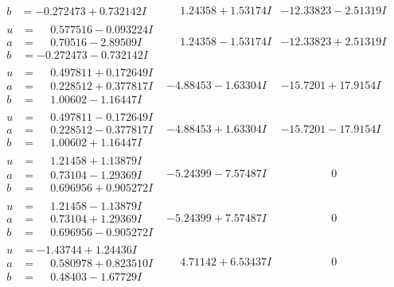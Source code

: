 \documentclass[1p]{elsarticle_modified}
\theoremstyle{definition}
\begin{document}
$$\begin{array}{c|c|c}
\begin{aligned}
b &= -0.272473 + 0.732142 I\end{aligned}
 & \phantom{-}1.24358 + 1.53174 I & -12.33823 - 2.51319 I \\ \hline\begin{aligned}
u &= \phantom{-}0.577516 - 0.093224 I \\
a &= \phantom{-}0.70516 - 2.89509 I \\
b &= -0.272473 - 0.732142 I\end{aligned}
 & \phantom{-}1.24358 - 1.53174 I & -12.33823 + 2.51319 I \\ \hline\begin{aligned}
u &= \phantom{-}0.497811 + 0.172649 I \\
a &= \phantom{-}0.228512 + 0.377817 I \\
b &= \phantom{-}1.00602 - 1.16447 I\end{aligned}
 & -4.88453 - 1.63304 I & -15.7201 + 17.9154 I \\ \hline\begin{aligned}
u &= \phantom{-}0.497811 - 0.172649 I \\
a &= \phantom{-}0.228512 - 0.377817 I \\
b &= \phantom{-}1.00602 + 1.16447 I\end{aligned}
 & -4.88453 + 1.63304 I & -15.7201 - 17.9154 I \\ \hline\begin{aligned}
u &= \phantom{-}1.21458 + 1.13879 I \\
a &= \phantom{-}0.73104 - 1.29369 I \\
b &= \phantom{-}0.696956 + 0.905272 I\end{aligned}
 & -5.24399 - 7.57487 I & \phantom{-0.000000 } 0 \\ \hline\begin{aligned}
u &= \phantom{-}1.21458 - 1.13879 I \\
a &= \phantom{-}0.73104 + 1.29369 I \\
b &= \phantom{-}0.696956 - 0.905272 I\end{aligned}
 & -5.24399 + 7.57487 I & \phantom{-0.000000 } 0 \\ \hline\begin{aligned}
u &= -1.43744 + 1.24436 I \\
a &= \phantom{-}0.580978 + 0.823510 I \\
b &= \phantom{-}0.48403 - 1.67729 I\end{aligned}
 & \phantom{-}4.71142 + 6.53437 I & \phantom{-0.000000 } 0 \\ \hline\begin{aligned}

\end{aligned}
\end{array}$$
\end{document}
